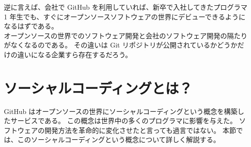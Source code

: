 逆に言えば、会社で GitHub を利用していれば、新卒で入社してきたプログラマ 1 年生でも、すぐにオープンソースソフトウェアの世界にデビューできるようになるはずである。\\

オープンソースの世界でのソフトウェア開発と会社のソフトウェア開発の隔たりがなくなるのである。
その違いは Git リポジトリが公開されているかどうかだけの違いになる企業すら存在するだろう。
\section{ソーシャルコーディングとは？}
GitHub はオープンソースの世界にソーシャルコーディングという概念を構築したサービスである。
この概念は世界中の多くのプログラマに影響を与えた。
ソフトウェアの開発方法を革命的に変化させたと言っても過言ではない。
本節では、このソーシャルコーディングという概念について詳しく解説する。\\

